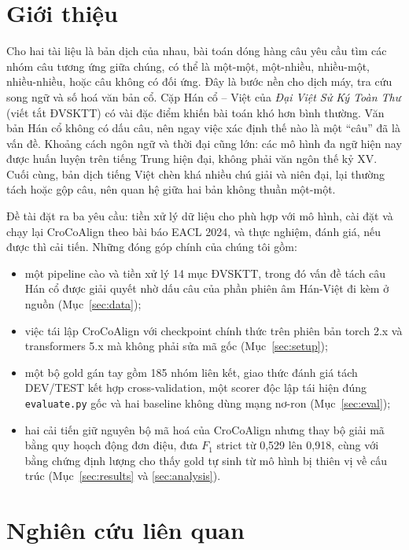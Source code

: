 \documentclass[11pt,a4paper]{article}
\newcommand{\code}[1]{\texttt{#1}}
\newcommand{\croco}{CroCoAlign}
\begin{document}
\section{Giới thiệu}

Cho hai tài liệu là bản dịch của nhau, bài toán dóng hàng câu yêu cầu tìm các nhóm câu tương ứng giữa chúng, có thể là
một-một, một-nhiều, nhiều-một, nhiều-nhiều, hoặc câu không có đối ứng. Đây là bước nền cho dịch máy, tra cứu song ngữ và
số hoá văn bản cổ. Cặp Hán cổ -- Việt của \emph{Đại Việt Sử Ký Toàn Thư} (viết tắt ĐVSKTT) có vài đặc điểm khiến bài
toán khó hơn bình thường. Văn bản Hán cổ không có dấu câu, nên ngay việc xác định thế nào là một ``câu'' đã là vấn đề.
Khoảng cách ngôn ngữ và thời đại cũng lớn: các mô hình đa ngữ hiện nay được huấn luyện trên tiếng Trung hiện đại, không
phải văn ngôn thế kỷ XV. Cuối cùng, bản dịch tiếng Việt chèn khá nhiều chú giải và niên đại, lại thường tách hoặc gộp
câu, nên quan hệ giữa hai bản không thuần một-một.

Đề tài đặt ra ba yêu cầu: tiền xử lý dữ liệu cho phù hợp với mô hình, cài đặt và chạy lại \croco{} \cite{crocoalign}
theo bài báo EACL 2024, và thực nghiệm, đánh giá, nếu được thì cải tiến. Những đóng góp chính của chúng tôi gồm:
\begin{itemize}
  \item một pipeline cào và tiền xử lý 14 mục ĐVSKTT, trong đó vấn đề tách câu Hán cổ được giải quyết nhờ dấu câu của
  phần phiên âm Hán-Việt đi kèm ở nguồn (Mục~\ref{sec:data});
  \item việc tái lập \croco{} với checkpoint chính thức trên phiên bản torch 2.x và transformers 5.x mà không phải sửa
  mã gốc (Mục~\ref{sec:setup});
  \item một bộ gold gán tay gồm 185 nhóm liên kết, giao thức đánh giá tách DEV/TEST kết hợp cross-validation, một
  scorer độc lập tái hiện đúng \code{evaluate.py} gốc và hai baseline không dùng mạng nơ-ron (Mục~\ref{sec:eval});
  \item hai cải tiến giữ nguyên bộ mã hoá của \croco{} nhưng thay bộ giải mã bằng quy hoạch động đơn điệu, đưa $F_1$
  strict từ 0,529 lên 0,918, cùng với bằng chứng định lượng cho thấy gold tự sinh từ mô hình bị thiên vị về cấu trúc
  (Mục~\ref{sec:results} và \ref{sec:analysis}).
\end{itemize}

\section{Nghiên cứu liên quan}
\end{document}
